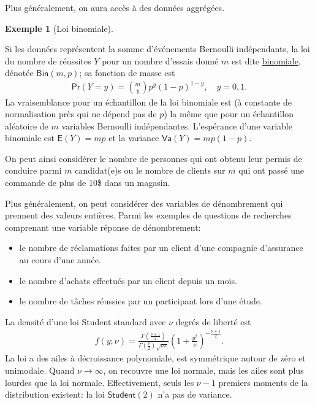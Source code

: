 \documentclass[
  11pt,
  letterpaper,
]{scrbook}
\providecommand{\tightlist}{%
  \setlength{\itemsep}{0pt}\setlength{\parskip}{0pt}}\usepackage{longtable,booktabs,array}
\theoremstyle{definition}
\theoremstyle{definition}
\newtheorem{example}{Exemple}[chapter]
\theoremstyle{remark}
\begin{document}
Plus généralement, on aura accès à des données aggrégées.

\begin{example}[Loi
binomiale]\protect\hypertarget{exm-loibinom}{}\label{exm-loibinom}

Si les données représentent la somme d'événements Bernoulli
indépendants, la loi du nombre de réussites \(Y\) pour un nombre
d'essais donné \(m\) est dite
\href{https://fr.wikipedia.org/wiki/Loi_binomiale}{binomiale}, dénotée
\(\mathsf{Bin}(m, p)\); sa fonction de masse est \begin{align*}
\mathsf{Pr}(Y=y) = \binom{m}{y}p^y (1-p)^{1-y}, \quad y=0, 1.
\end{align*} La vraisemblance pour un échantillon de la loi binomiale
est (à constante de normalisation près qui ne dépend pas de \(p\)) la
même que pour un échantillon aléatoire de \(m\) variables Bernoulli
indépendantes. L'espérance d'une variable binomiale est
\(\mathsf{E}(Y)=mp\) et la variance \(\mathsf{Va}(Y)=mp(1-p)\).

\end{example}

On peut ainsi considérer le nombre de personnes qui ont obtenu leur
permis de conduire parmi \(m\) candidat(e)s ou le nombre de clients sur
\(m\) qui ont passé une commande de plus de 10\$ dans un magasin.

Plus généralement, on peut considérer des variables de dénombrement qui
prennent des valeurs entières. Parmi les exemples de questions de
recherches comprenant une variable réponse de dénombrement:

\begin{itemize}
\tightlist
\item
  le nombre de réclamations faites par un client d'une compagnie
  d'assurance au cours d'une année.
\item
  le nombre d'achats effectués par un client depuis un mois.
\item
  le nombre de tâches réussies par un participant lors d'une étude.
\end{itemize}

La densité d'une loi Student standard avec \(\nu\) degrés de liberté est
\begin{align*}
f(y; \nu) = \frac{\Gamma \left( \frac{\nu+1}{2}\right)}{\Gamma\left(\frac{\nu}{2}\right)
\sqrt{\nu\pi}}\left(1+\frac{y^{2}}{\nu}\right)^{-\frac{\nu+1}{2}}.
\end{align*} La loi a des ailes à décroissance polynomiale, est
symmétrique autour de zéro et unimodale. Quand \(\nu \to \infty\), on
recouvre une loi normale, mais les ailes sont plus lourdes que la loi
normale. Effectivement, seuls les \(\nu-1\) premiers moments de la
distribution existent: la loi \(\mathsf{Student}(2)\) n'a pas de
variance.
\end{document}
